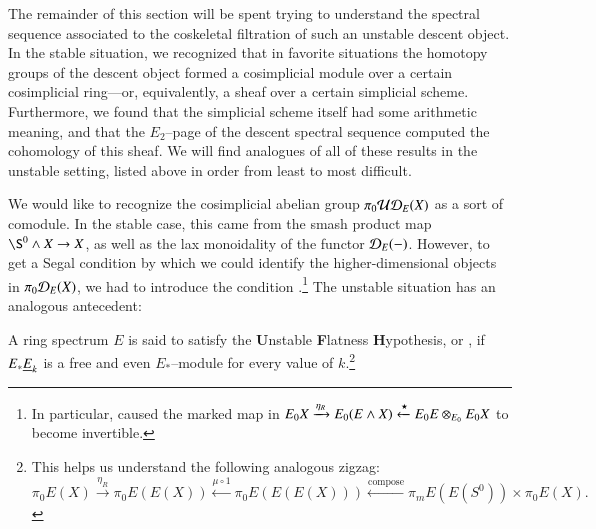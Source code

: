 The remainder of this section will be spent trying to understand the spectral sequence associated to the coskeletal filtration of such an unstable descent object.  In the stable situation, we recognized that in favorite situations the homotopy groups of the descent object formed a cosimplicial module over a certain cosimplicial ring---or, equivalently, a sheaf over a certain simplicial scheme.  Furthermore, we found that the simplicial scheme itself had some arithmetic meaning, and that the $E_2$--page of the descent spectral sequence computed the cohomology of this sheaf.  We will find analogues of all of these results in the unstable setting, listed above in order from least to most difficult.

We would like to recognize the cosimplicial abelian group $\pi_0 \mathcal{UD}_E(X)$ as a sort of comodule.  In the stable case, this came from the smash product map $\S^0 \sm X \to X$, as well as the lax monoidality of the functor $\mathcal{D}_E(-)$.  However, to get a Segal condition by which we could identify the higher-dimensional objects in $\pi_0 \mathcal{D}_E(X)$, we had to introduce the condition .\footnote{In particular, {\FH} caused the marked map in $E_0 X \xrightarrow{\eta_R} E_0(E \wedge X) \xleftarrow{\star} E_0 E \otimes_{E_0} E_0 X$ to become invertible.}  The unstable situation has an analogous antecedent:

\begin{definition}
A ring spectrum $E$ is said to satisfy the \textbf{U}nstable \textbf{F}latness \textbf{H}ypothesis, or \UFH, if $E_* \underline{\smash{E}}_{k}$ is a free and even $E_*$--module for every value of $k$.\footnote{This helps us understand the following analogous zigzag: \[\pi_0 E(X) \xrightarrow{\eta_R} \pi_0 E(E(X)) \xleftarrow{\mu \circ 1} \pi_0 E(E(E(X))) \xleftarrow{\mathrm{compose}} \pi_m E(E(S^0)) \times \pi_0 E(X).\]}
\end{definition}

